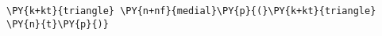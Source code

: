 \begin{Verbatim}[commandchars=\\\{\}]
    \PY{k+kt}{triangle} \PY{n+nf}{medial}\PY{p}{(}\PY{k+kt}{triangle} \PY{n}{t}\PY{p}{)}
\end{Verbatim}
